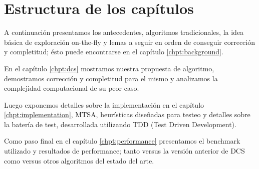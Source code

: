 \section{Estructura de los capítulos}

A continuación presentamos los antecedentes, algoritmos tradicionales, la idea básica de exploración on-the-fly y lemas a seguir en orden de conseguir corrección y completitud; ésto puede encontrarse en el capítulo \ref{chpt:background}.

En el capítulo \ref{chpt:dcs} mostramos nuestra propuesta de algoritmo, demostramos corrección y completitud para el mismo y analizamos la complejidad computacional de su peor caso.

Luego exponemos detalles sobre la implementación en el capítulo \ref{chpt:implementation}, MTSA, heurísticas diseñadas para testeo y detalles sobre la batería de test, desarrollada utilizando TDD (Test Driven Development).

Como paso final en el capítulo \ref{chpt:performance} presentamos el benchmark utilizado y resultados de performance; tanto versus la versión anterior de DCS como versus otros algoritmos del estado del arte.










